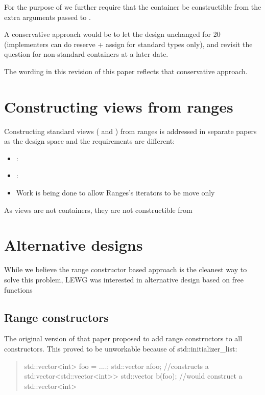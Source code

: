\documentclass{wg21}
\begin{document}
For the purpose of  we further require that the container be constructible 
from the extra arguments passed to .


A conservative approach would be to let the design unchanged for 20 (implementers can do reserve + assign for standard types only),
and revisit the question for non-standard containers at a later date.

The wording in this revision of this paper reflects that conservative approach.



\section{Constructing views from ranges}

Constructing standard views ( and ) from ranges is addressed in separate papers as
the design space and the requirements are different:

\begin{itemize}
	\item {} : \cite{P1391}
	\item  {}       : \cite{P1394}
	\item Work is being done to allow Ranges's iterators to be move only
\end{itemize}

As views are not containers, they are not constructible from 


\section{Alternative designs}

While we believe the range constructor based approach is the cleanest way to solve this problem,
LEWG was interested in alternative design based on free functions

\subsection{Range constructors}

The original version of that paper proposed to add range constructors to all constructors.
This proved to be unworkable because of std::initializer_list:

\begin{quote}
	\begin{colorblock}
		std::vector<int> foo = ....;
		std::vector a{foo}; //constructs a std:vector<std::vector<int>>
		std::vector b(foo); //would construct a std::vector<int>
	\end{colorblock}
\end{quote}
\end{document}
